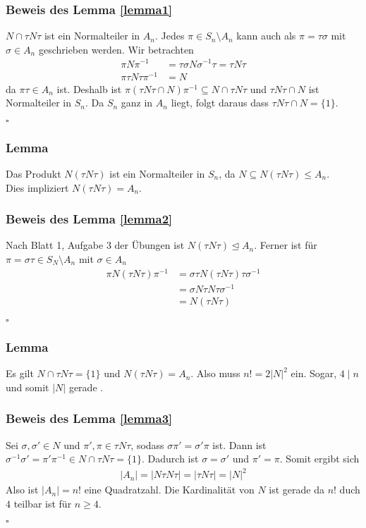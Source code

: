 \documentclass[12pt, german]{article}
\newcommand{\bewiesen}{
	
	\begin{flushright}
		$\square$  \\
\end{flushright}}
\begin{document}
	\subsubsection{Beweis des Lemma \ref{lemma1}}
	$N \cap \tau N \tau$ ist ein Normalteiler in $A_n$. Jedes $\pi \in S_n \setminus A_n$ kann auch als $\pi = \tau\sigma$ mit $\sigma \in A_n$ geschrieben werden.
	Wir betrachten 
	\begin{align*}
		\pi N \pi^{-1} &= \tau \sigma N \sigma^{-1} \tau = \tau N \tau  \\ 
		\pi \tau N \tau \pi^{-1} &= N
	\end{align*} 
	da $\pi\tau \in A_n$ ist. 
	Deshalb ist $\pi(\tau N \tau \cap N) \pi^{-1} \subseteq N \cap \tau N \tau$ und $\tau N \tau \cap N$ ist Normalteiler in $S_n$. Da $S_n$ ganz in $A_n$ liegt, folgt daraus dass $\tau N \tau \cap N = \{1\}$. 
	\bewiesen
	
	\subsubsection{Lemma \label{lemma2}}
	Das Produkt $N(\tau N \tau)$ ist ein Normalteiler in $S_n$, da $N \subseteq N(\tau N \tau) \leq A_n$. \\ 
	Dies impliziert $N(\tau N \tau) = A_n$.
	\subsubsection{Beweis des Lemma \ref{lemma2}}
	Nach Blatt 1, Aufgabe 3 der Übungen ist $N(\tau N \tau) \trianglelefteq A_n$. Ferner ist für $\pi = \sigma\tau \in S_N \setminus A_n$ mit $\sigma \in A_n$ 
	\begin{align*}
		\pi N(\tau N\tau) \pi^{-1} &= \sigma \tau N (\tau N \tau) \tau \sigma^{-1}  \\ 
		&= \sigma N \tau N \tau \sigma^{-1} \\
		&= N(\tau N \tau)
	\end{align*}
	\bewiesen
	
	\subsubsection{Lemma \label{lemma3}}
	Es gilt $N\cap \tau N \tau =  \{1\}$ und $N(  \tau N \tau ) = A_n$. Also muss $n! = 2 |N|^2$ ein. Sogar, $4 \mid n$ und somit $|N|$ gerade . 
	\subsubsection{Beweis des Lemma \ref{lemma3}}
	Sei $\sigma, \sigma' \in N$ und $\pi', \pi \in \tau N \tau$, sodass $\sigma\pi' = \sigma'\pi$ ist. Dann ist $\sigma^{-1}\sigma' = \pi'\pi^{-1} \in N \cap \tau N \tau = \{1\}$. Dadurch ist $\sigma = \sigma'$ und $\pi' = \pi$. Somit ergibt sich 
	\begin{align*}
		|A_n| = |N\tau N\tau| = |\tau N \tau| = |N|^2
	\end{align*}
	Also ist $|A_n| = n!$ eine Quadratzahl. Die Kardinalität von $N$ ist gerade da $n!$ duch $4$ teilbar ist für $n \geq 4$. 
	\bewiesen
	
\end{document}

